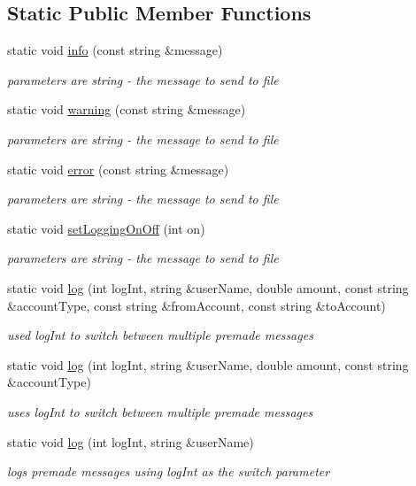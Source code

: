 \subsection*{Static Public Member Functions}
\begin{DoxyCompactItemize}
\item 
static void \hyperlink{classLogger_abd3c81f13327bf11d2523d2cadc5d34a}{info} (const string \&message)
\begin{DoxyCompactList}\small\item\em parameters are string -\/ the message to send to file \end{DoxyCompactList}\item 
static void \hyperlink{classLogger_ac4913cb3558a405491d8e01e254944a4}{warning} (const string \&message)
\begin{DoxyCompactList}\small\item\em parameters are string -\/ the message to send to file \end{DoxyCompactList}\item 
static void \hyperlink{classLogger_ade2e169a25c9fb5d0dc4b419b37566b3}{error} (const string \&message)
\begin{DoxyCompactList}\small\item\em parameters are string -\/ the message to send to file \end{DoxyCompactList}\item 
static void \hyperlink{classLogger_a5fcfe9604845c1fc90bdf4d8642e82c1}{set\-Logging\-On\-Off} (int on)
\begin{DoxyCompactList}\small\item\em parameters are string -\/ the message to send to file \end{DoxyCompactList}\item 
static void \hyperlink{classLogger_afd3da0948ec5bbea897b0f9d3379d7aa}{log} (int log\-Int, string \&user\-Name, double amount, const string \&account\-Type, const string \&from\-Account, const string \&to\-Account)
\begin{DoxyCompactList}\small\item\em used log\-Int to switch between multiple premade messages \end{DoxyCompactList}\item 
static void \hyperlink{classLogger_a65088a9394d167283dd7f3673c95c49d}{log} (int log\-Int, string \&user\-Name, double amount, const string \&account\-Type)
\begin{DoxyCompactList}\small\item\em uses log\-Int to switch between multiple premade messages \end{DoxyCompactList}\item 
static void \hyperlink{classLogger_a110813a074e05328bcc3be376a49b161}{log} (int log\-Int, string \&user\-Name)
\begin{DoxyCompactList}\small\item\em logs premade messages using log\-Int as the switch parameter \end{DoxyCompactList}\end{DoxyCompactItemize}



